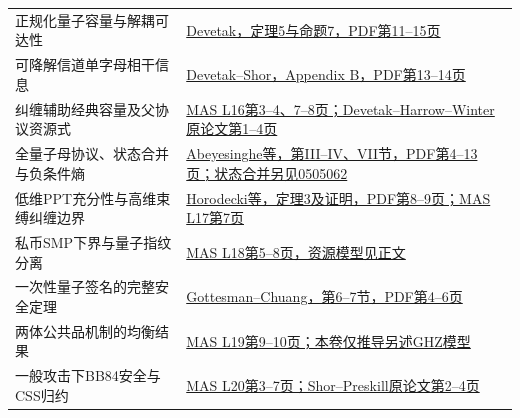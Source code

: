 \begin{longtable}{p{.28\linewidth}p{.63\linewidth}}
正规化量子容量与解耦可达性 & \href{https://arxiv.org/abs/quant-ph/0304127}{Devetak，定理5与命题7，PDF第11--15页}\\
可降解信道单字母相干信息 & \href{https://arxiv.org/abs/quant-ph/0311131}{Devetak--Shor，Appendix B，PDF第13--14页}\\
纠缠辅助经典容量及父协议资源式 & \href{https://arxiv.org/abs/quant-ph/0308044}{MAS L16第3--4、7--8页；Devetak--Harrow--Winter原论文第1--4页}\\
全量子母协议、状态合并与负条件熵 & \href{https://arxiv.org/abs/quant-ph/0606225}{Abeyesinghe等，第III--IV、VII节，PDF第4--13页；状态合并另见0505062}\\
低维PPT充分性与高维束缚纠缠边界 & \href{https://arxiv.org/abs/quant-ph/9605038}{Horodecki等，定理3及证明，PDF第8--9页；MAS L17第7页}\\
私币SMP下界与量子指纹分离 & \href{https://ocw.mit.edu/courses/mas-865j-quantum-information-science-spring-2006/a3023c8cf793563ba7f31391d5135711_lecture_18.pdf}{MAS L18第5--8页，资源模型见正文}\\
一次性量子签名的完整安全定理 & \href{https://arxiv.org/abs/quant-ph/0105032}{Gottesman--Chuang，第6--7节，PDF第4--6页}\\
两体公共品机制的均衡结果 & \href{https://ocw.mit.edu/courses/mas-865j-quantum-information-science-spring-2006/905ee40bf818ef29fa0beca49657c5ae_lecture_19.pdf}{MAS L19第9--10页；本卷仅推导另述GHZ模型}\\
一般攻击下BB84安全与CSS归约 & \href{https://arxiv.org/abs/quant-ph/0003004}{MAS L20第3--7页；Shor--Preskill原论文第2--4页}\\
\bottomrule\end{longtable}
